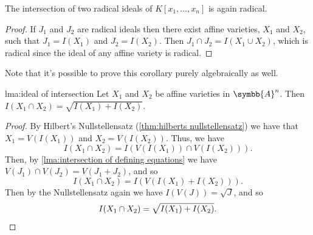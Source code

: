 \documentclass[fleqn]{NotesClass}
\newcommand{\affine}{\symbb{A}}
\begin{document}
    \begin{crl}{}{}
        The intersection of two radical ideals of \(K[x_1, \dotsc, x_n]\) is again radical.
        \begin{proof}
            If \(J_1\) and \(J_2\) are radical ideals then there exist affine varieties, \(X_1\) and \(X_2\), such that \(J_1 = I(X_1)\) and \(J_2 = I(X_2)\).
            Then \(J_1 \cap J_2 = I(X_1 \cup X_2)\), which is radical since the ideal of any affine variety is radical.
        \end{proof}
    \end{crl}
    
    Note that it's possible to prove this corollary purely algebraically as well.
    
    \begin{lma}{}{lma:ideal of intersection}
        Let \(X_1\) and \(X_2\) be affine varieties in \(\affine^n\).
        Then \(I(X_1 \cap X_2) = \sqrt{I(X_1) + I(X_2)}\).
        \begin{proof}
            By Hilbert's Nullstellensatz (\cref{thm:hilberts nullstellensatz}) we have that \(X_1 = V(I(X_1))\) and \(X_2 = V(I(X_2))\).
            Thus, we have
            \begin{equation}
                I(X_1 \cap X_2) = I(V(I(X_1)) \cap V(I(X_2))).
            \end{equation}
            Then, by \cref{lma:intersection of defining equations} we have \(V(J_1) \cap V(J_2) = V(J_1 + J_2)\), and so
            \begin{equation}
                I(X_1 \cap X_2) = I(V(I(X_1) + I(X_2))).
            \end{equation}
            Then by the Nullstellensatz again we have \(I(V(J)) = \sqrt{J}\), and so
            \begin{equation*}
                I(X_1 \cap X_2) = \sqrt{I(X_1) + I(X_2)}. \qedhere
            \end{equation*}
        \end{proof}
    \end{lma}
    
\end{document}
